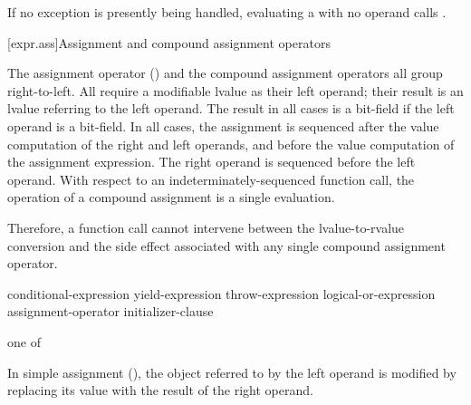 \pnum
{}%
%
%
If no exception is presently being handled,
evaluating a
with no operand calls
.

[expr.ass]{Assignment and compound assignment operators}%

\pnum
{}%
%
%
%
%
%
%
%
%
%
%
%
The assignment operator (\tcode{=}) and the compound assignment
operators all group right-to-left.
%
All
require a modifiable lvalue as their left operand; their result is an lvalue
referring to the left operand. The result in all cases is a bit-field if
the left operand is a bit-field. In all cases, the assignment is
sequenced after the
%
value computation of the right and left operands,
and before the
value computation of the assignment expression.
The right operand is sequenced before the left operand.
With
respect to an indeterminately-sequenced function call, the operation of
a compound assignment is a single evaluation.
\begin{note}
Therefore, a function call cannot intervene between the
lvalue-to-rvalue conversion and the side effect associated with any
single compound assignment operator.
\end{note}

\begin{bnf}
\br
    conditional-expression\br
    yield-expression\br
    throw-expression\br
    logical-or-expression assignment-operator initializer-clause
\end{bnf}

\begin{bnf}
 \textnormal{one of}\br
    \terminal{=  *=  /=  \%=   +=  -=  >>=  <<=  \&=  \caret=  |=}
\end{bnf}

\pnum
In simple assignment (\tcode{=}), the object referred to by the left operand
is modified
by replacing its value with the result of the right operand.

